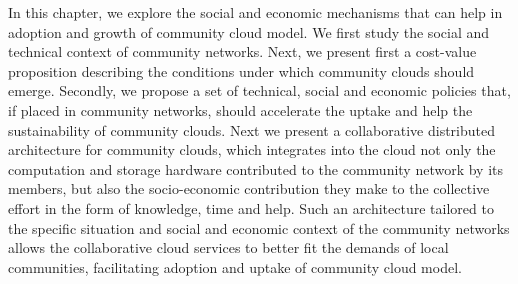 

In this chapter, we explore the social and economic mechanisms that can help in adoption and growth of community cloud model. 
We first study the social and technical context of community networks.
Next, we present first a cost-value proposition describing the conditions under which community clouds should emerge. 
Secondly, we propose a set of technical, social and economic policies that, if placed in community networks, should accelerate the uptake and help the sustainability of community clouds. 
%
Next we present a collaborative distributed architecture for community clouds, which integrates into the cloud not only the computation and storage hardware contributed to the community network by its members, but also the socio-economic contribution they make to the collective effort in the form of knowledge, time and help.
Such an architecture tailored to the specific situation and social and economic context of the community networks allows the collaborative cloud services to better fit the demands of local communities, facilitating adoption and uptake of community cloud model.


